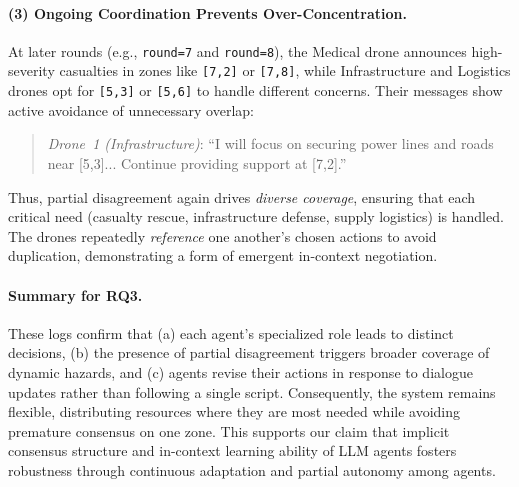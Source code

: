 \paragraph{(3) Ongoing Coordination Prevents Over-Concentration.}
At later rounds (e.g., \texttt{round=7} and \texttt{round=8}), the Medical drone announces high-severity casualties in zones like \texttt{[7,2]} or \texttt{[7,8]}, while Infrastructure and Logistics drones opt for \texttt{[5,3]} or \texttt{[5,6]} to handle different concerns. Their messages show active avoidance of unnecessary overlap:
\begin{quote}
\emph{Drone~1 (Infrastructure)}: ``I will focus on securing power lines and roads near [5,3]... Continue providing support at [7,2].''
\end{quote}

Thus, partial disagreement again drives \emph{diverse coverage}, ensuring that each critical need (casualty rescue, infrastructure defense, supply logistics) is handled. The drones repeatedly \emph{reference} one another’s chosen actions to avoid duplication, demonstrating a form of emergent in-context negotiation.

\paragraph{Summary for RQ3.}
These logs confirm that (a) each agent’s specialized role leads to distinct decisions, (b) the presence of partial disagreement triggers broader coverage of dynamic hazards, and (c) agents revise their actions in response to dialogue updates rather than following a single script. Consequently, the system remains flexible, distributing resources where they are most needed while avoiding premature consensus on one zone. This supports our claim that implicit consensus structure and in-context learning ability of LLM agents fosters robustness through continuous adaptation and partial autonomy among agents.

